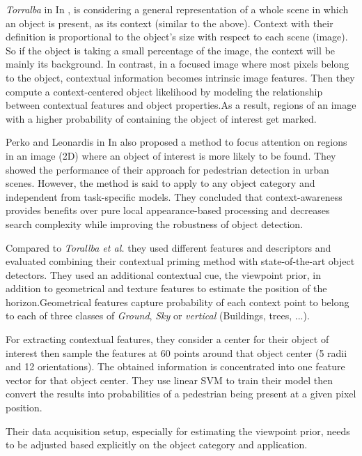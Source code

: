      
     {\it Torralba} in In \cite{TorralbaContextualPriming}, is considering a general representation of a whole scene in which an object is present, as its context (similar to the above). Context with their definition is proportional to the object's size with respect to each scene (image). So if the object is taking a small percentage of the image, the context will be mainly its background. In contrast, in a focused image where most pixels belong to the object, contextual information becomes intrinsic image features. Then they compute a context-centered object likelihood by modeling the relationship between contextual features and object properties.As a result, regions of an image with a higher probability of containing the object of interest get marked.   
     
     Perko and Leonardis in In \cite{PerkoLeonardisContextDriven} also proposed a method to focus attention on regions in an image (2D) where an object of interest is more likely to be found. They showed the performance of their approach for pedestrian detection in urban scenes. However, the method is said to apply to any object category and independent from task-specific models. They concluded that context-awareness provides benefits over pure local appearance-based processing and decreases search complexity while improving the robustness of object detection. 
     
     Compared to \textit{Torallba et al.} they used different features and descriptors and evaluated combining their contextual priming method with state-of-the-art object detectors. They used an additional contextual cue, the viewpoint prior, in addition to geometrical and texture features to estimate the position of the horizon.Geometrical features capture probability of each context point to belong to each of three classes of \textit{Ground}, \textit{Sky} or \textit{vertical} (Buildings, trees, ...). 
     
     For extracting contextual features, they consider a center for their object of interest then sample the features at 60 points around that object center (5 radii and 12 orientations). The obtained information is concentrated into one feature vector for that object center. They use linear SVM to train their model then convert the results into probabilities of a pedestrian being present at a given pixel position. 
     
     Their data acquisition setup, especially for estimating the viewpoint prior, needs to be adjusted based explicitly on the object category and application. 
     
